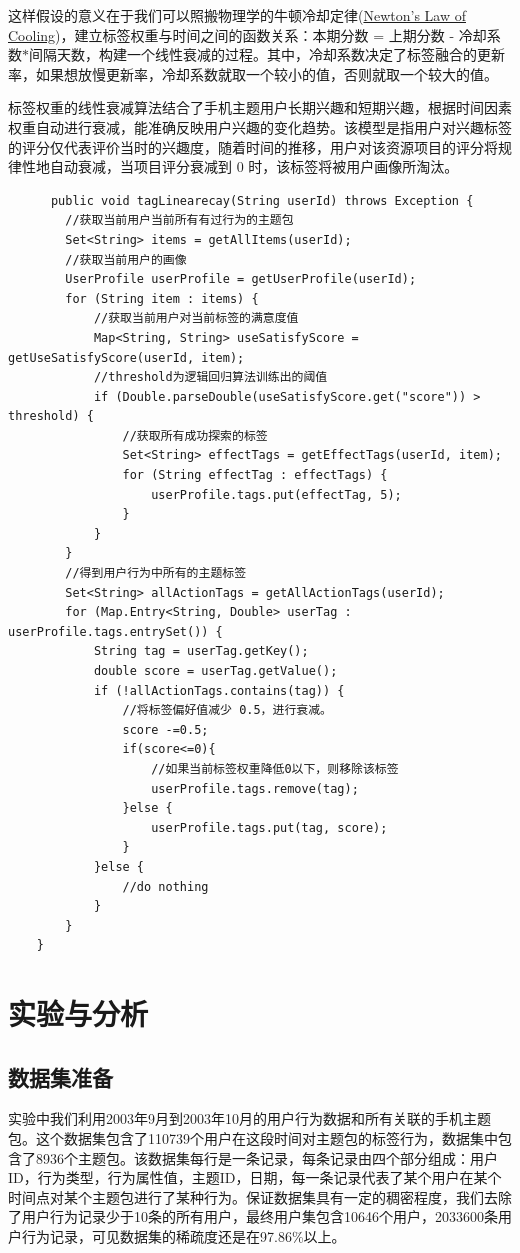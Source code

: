   这样假设的意义在于我们可以照搬物理学的牛顿冷却定律(\href{http://www.evanmiller.org/rank-hotness-with-newtons-law-of-cooling.html}{Newton's Law of Cooling})，建立标签权重与时间之间的函数关系：本期分数 = 上期分数 - 冷却系数$*$间隔天数，构建一个线性衰减的过程。其中，冷却系数决定了标签融合的更新率，如果想放慢更新率，冷却系数就取一个较小的值，否则就取一个较大的值。

  标签权重的线性衰减算法结合了手机主题用户长期兴趣和短期兴趣，根据时间因素权重自动进行衰减，能准确反映用户兴趣的变化趋势。该模型是指用户对兴趣标签的评分仅代表评价当时的兴趣度，随着时间的推移，用户对该资源项目的评分将规律性地自动衰减，当项目评分衰减到 0 时，该标签将被用户画像所淘汰。
  \begin{lstlisting}
      public void tagLinearecay(String userId) throws Exception {
        //获取当前用户当前所有有过行为的主题包
        Set<String> items = getAllItems(userId);
        //获取当前用户的画像
        UserProfile userProfile = getUserProfile(userId);
        for (String item : items) {
            //获取当前用户对当前标签的满意度值
            Map<String, String> useSatisfyScore = getUseSatisfyScore(userId, item);
            //threshold为逻辑回归算法训练出的阈值
            if (Double.parseDouble(useSatisfyScore.get("score")) > threshold) {
                //获取所有成功探索的标签
                Set<String> effectTags = getEffectTags(userId, item);
                for (String effectTag : effectTags) {
                    userProfile.tags.put(effectTag, 5);
                }
            }
        }
        //得到用户行为中所有的主题标签
        Set<String> allActionTags = getAllActionTags(userId);
        for (Map.Entry<String, Double> userTag : userProfile.tags.entrySet()) {
            String tag = userTag.getKey();
            double score = userTag.getValue();
            if (!allActionTags.contains(tag)) {
                //将标签偏好值减少 0.5，进行衰减。
                score -=0.5;
                if(score<=0){
                    //如果当前标签权重降低0以下，则移除该标签
                    userProfile.tags.remove(tag);  
                }else {
                    userProfile.tags.put(tag, score);
                }
            }else {
                //do nothing
            }
        }
    }
  \end{lstlisting}


\section{实验与分析}
  \subsection{数据集准备}
  实验中我们利用2003年9月到2003年10月的用户行为数据和所有关联的手机主题包。这个数据集包含了110739个用户在这段时间对主题包的标签行为，数据集中包含了8936个主题包。该数据集每行是一条记录，每条记录由四个部分组成：用户ID，行为类型，行为属性值，主题ID，日期，每一条记录代表了某个用户在某个时间点对某个主题包进行了某种行为。保证数据集具有一定的稠密程度，我们去除了用户行为记录少于10条的所有用户，最终用户集包含10646个用户，2033600条用户行为记录，可见数据集的稀疏度还是在97.86\%以上。
